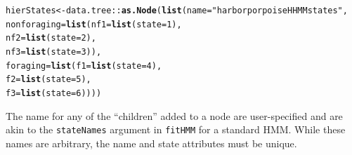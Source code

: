 \documentclass[12pt]{article}\usepackage[]{graphicx}\usepackage[]{xcolor}
\makeatletter
\newcommand{\hlnum}[1]{\textcolor[rgb]{0.686,0.059,0.569}{#1}}%
\newcommand{\hlsng}[1]{\textcolor[rgb]{0.192,0.494,0.8}{#1}}%
\newcommand{\hlopt}[1]{\textcolor[rgb]{0,0,0}{#1}}%
\newcommand{\hldef}[1]{\textcolor[rgb]{0.345,0.345,0.345}{#1}}%
\newcommand{\hlkwb}[1]{\textcolor[rgb]{0.69,0.353,0.396}{#1}}%
\newcommand{\hlkwc}[1]{\textcolor[rgb]{0.333,0.667,0.333}{#1}}%
\newcommand{\hlkwd}[1]{\textcolor[rgb]{0.737,0.353,0.396}{\textbf{#1}}}%
\newenvironment{kframe}{%
 \def\at@end@of@kframe{}%
 \ifinner\ifhmode%
  \def\at@end@of@kframe{\end{minipage}}%
  \begin{minipage}{\columnwidth}%
 \fi\fi%
 \def\FrameCommand##1{\hskip\@totalleftmargin \hskip-\fboxsep
 \colorbox{shadecolor}{##1}\hskip-\fboxsep
     \hskip-\linewidth \hskip-\@totalleftmargin \hskip\columnwidth}%
 \MakeFramed {\advance\hsize-\width
   \@totalleftmargin\z@ \linewidth\hsize
   \@setminipage}}%
 {\par\unskip\endMakeFramed%
 \at@end@of@kframe}
\newenvironment{knitrout}{}{} %
\makeatother
\begin{document}
\begin{knitrout}
\color{fgcolor}\begin{kframe}
\begin{alltt}
\hldef{hierStates} \hlkwb{<-} \hldef{data.tree}\hlopt{::}\hlkwd{as.Node}\hldef{(}\hlkwd{list}\hldef{(}\hlkwc{name}\hldef{=}\hlsng{"harbor porpoise HHMM states"}\hldef{,}
                                      \hlkwc{nonforaging}\hldef{=}\hlkwd{list}\hldef{(}\hlkwc{nf1}\hldef{=}\hlkwd{list}\hldef{(}\hlkwc{state}\hldef{=}\hlnum{1}\hldef{),}
                                                       \hlkwc{nf2}\hldef{=}\hlkwd{list}\hldef{(}\hlkwc{state}\hldef{=}\hlnum{2}\hldef{),}
                                                       \hlkwc{nf3}\hldef{=}\hlkwd{list}\hldef{(}\hlkwc{state}\hldef{=}\hlnum{3}\hldef{)),}
                                      \hlkwc{foraging}\hldef{=}\hlkwd{list}\hldef{(}\hlkwc{f1}\hldef{=}\hlkwd{list}\hldef{(}\hlkwc{state}\hldef{=}\hlnum{4}\hldef{),}
                                                    \hlkwc{f2}\hldef{=}\hlkwd{list}\hldef{(}\hlkwc{state}\hldef{=}\hlnum{5}\hldef{),}
                                                    \hlkwc{f3}\hldef{=}\hlkwd{list}\hldef{(}\hlkwc{state}\hldef{=}\hlnum{6}\hldef{))))}
\end{alltt}
\end{kframe}
\end{knitrout}
\noindent The name for any of the ``children'' added to a node are user-specified and are akin to the \verb|stateNames| argument in \verb|fitHMM| for a standard HMM.  While these names are arbitrary, the name and state attributes must be unique.
\end{document}
